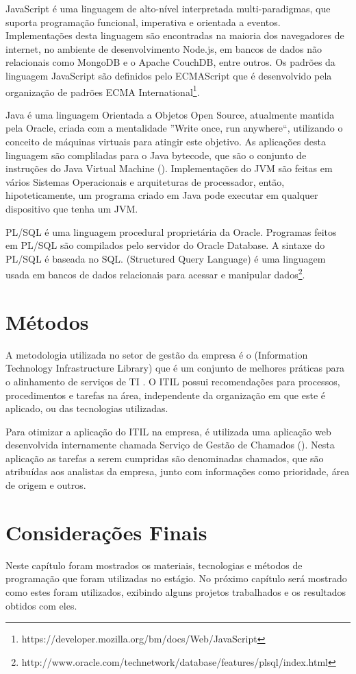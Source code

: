 JavaScript é uma linguagem de alto-nível interpretada multi-paradigmas, que suporta programação funcional, imperativa e orientada a eventos. Implementações desta linguagem são encontradas na maioria dos navegadores de internet, no ambiente de desenvolvimento Node.js, em bancos de dados não relacionais como MongoDB e o Apache CouchDB, entre outros. Os padrões da linguagem JavaScript são definidos pelo ECMAScript que é desenvolvido pela organização de padrões ECMA International\footnote{https://developer.mozilla.org/bm/docs/Web/JavaScript}.

Java é uma linguagem Orientada a Objetos Open Source, atualmente mantida pela Oracle, criada com a mentalidade ''Write once, run anywhere``, utilizando o conceito de máquinas virtuais para atingir este objetivo. As aplicações desta linguagem são compliladas para o Java bytecode, que são o conjunto de instruções do Java Virtual Machine (). Implementações do JVM são feitas em vários Sistemas Operacionais e arquiteturas de processador, então, hipoteticamente, um programa criado em Java pode executar em qualquer dispositivo que tenha um JVM.

PL/SQL é uma linguagem procedural proprietária da Oracle. Programas feitos em PL/SQL são compilados pelo servidor do Oracle Database. A sintaxe do PL/SQL é baseada no SQL.  (Structured Query Language) é uma linguagem usada em bancos de dados relacionais para acessar e manipular dados\footnote{http://www.oracle.com/technetwork/database/features/plsql/index.html}.

\section{Métodos}

A metodologia utilizada no setor de gestão da empresa é o  (Information Technology Infrastructure Library) que é um conjunto de melhores práticas para o alinhamento de serviços de TI  \cite{gallacher2012itil}. O ITIL possui recomendações para processos, procedimentos e tarefas na área, independente da organização em que este é aplicado, ou das tecnologias utilizadas. 

Para otimizar a aplicação do ITIL na empresa, é utilizada uma aplicação web desenvolvida internamente chamada Serviço de Gestão de Chamados (). Nesta aplicação as tarefas a serem cumpridas são denominadas chamados, que são atribuídas aos analistas da empresa, junto com informações como prioridade, área de origem e outros.

\section{Considerações Finais}

Neste capítulo foram mostrados os materiais, tecnologias e métodos de programação que foram utilizadas no estágio. No próximo capítulo será mostrado como estes foram utilizados, exibindo alguns projetos trabalhados e os resultados obtidos com eles.
